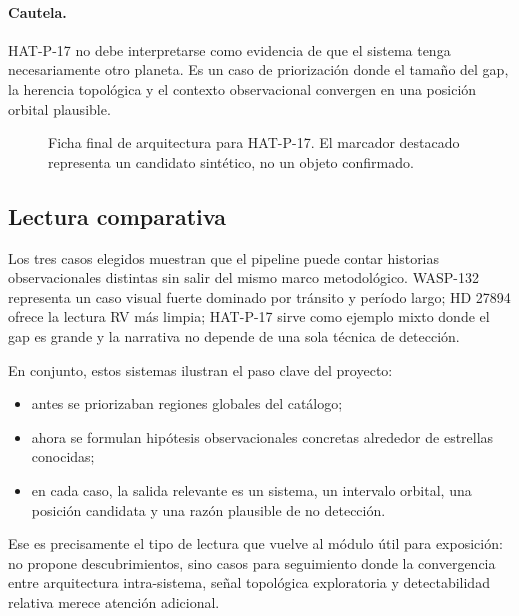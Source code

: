 \paragraph{Cautela.}
HAT-P-17 no debe interpretarse como evidencia de que el sistema tenga necesariamente otro planeta. Es un caso de priorizaci\'on donde el tama\~no del gap, la herencia topol\'ogica y el contexto observacional convergen en una posici\'on orbital plausible.

\begin{figure}[H]
\centering
{}
\caption{Ficha final de arquitectura para HAT-P-17. El marcador destacado representa un candidato sint\'etico, no un objeto confirmado.}
\label{fig:final-hatp17}
\end{figure}

\subsection{Lectura comparativa}

Los tres casos elegidos muestran que el pipeline puede contar historias observacionales distintas sin salir del mismo marco metodol\'ogico. WASP-132 representa un caso visual fuerte dominado por tr\'ansito y per\'iodo largo; HD 27894 ofrece la lectura RV m\'as limpia; HAT-P-17 sirve como ejemplo mixto donde el gap es grande y la narrativa no depende de una sola t\'ecnica de detecci\'on.

En conjunto, estos sistemas ilustran el paso clave del proyecto:
\begin{itemize}
\item antes se priorizaban regiones globales del cat\'alogo;
\item ahora se formulan hip\'otesis observacionales concretas alrededor de estrellas conocidas;
\item en cada caso, la salida relevante es un sistema, un intervalo orbital, una posici\'on candidata y una raz\'on plausible de no detecci\'on.
\end{itemize}

Ese es precisamente el tipo de lectura que vuelve al m\'odulo \'util para exposici\'on: no propone descubrimientos, sino casos para seguimiento donde la convergencia entre arquitectura intra-sistema, se\~nal topol\'ogica exploratoria y detectabilidad relativa merece atenci\'on adicional.
